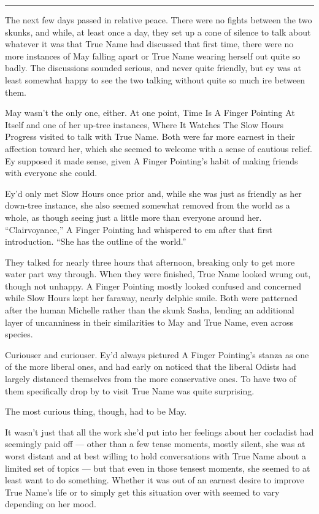 \begin{center}\rule{0.5\linewidth}{0.5pt}\end{center}

The next few days passed in relative peace. There were no fights between the two skunks, and while, at least once a day, they set up a cone of silence to talk about whatever it was that True Name had discussed that first time, there were no more instances of May falling apart or True Name wearing herself out quite so badly. The discussions sounded serious, and never quite friendly, but ey was at least somewhat happy to see the two talking without quite so much ire between them.

May wasn't the only one, either. At one point, Time Is A Finger Pointing At Itself and one of her up-tree instances, Where It Watches The Slow Hours Progress visited to talk with True Name. Both were far more earnest in their affection toward her, which she seemed to welcome with a sense of cautious relief. Ey supposed it made sense, given A Finger Pointing's habit of making friends with everyone she could.

Ey'd only met Slow Hours once prior and, while she was just as friendly as her down-tree instance, she also seemed somewhat removed from the world as a whole, as though seeing just a little more than everyone around her. ``Clairvoyance,'' A Finger Pointing had whispered to em after that first introduction. ``She has the outline of the world.''

They talked for nearly three hours that afternoon, breaking only to get more water part way through. When they were finished, True Name looked wrung out, though not unhappy. A Finger Pointing mostly looked confused and concerned while Slow Hours kept her faraway, nearly delphic smile. Both were patterned after the human Michelle rather than the skunk Sasha, lending an additional layer of uncanniness in their similarities to May and True Name, even across species.

Curiouser and curiouser. Ey'd always pictured A Finger Pointing's stanza as one of the more liberal ones, and had early on noticed that the liberal Odists had largely distanced themselves from the more conservative ones. To have two of them specifically drop by to visit True Name was quite surprising.

The most curious thing, though, had to be May.

It wasn't just that all the work she'd put into her feelings about her cocladist had seemingly paid off — other than a few tense moments, mostly silent, she was at worst distant and at best willing to hold conversations with True Name about a limited set of topics — but that even in those tensest moments, she seemed to at least want to do something. Whether it was out of an earnest desire to improve True Name's life or to simply get this situation over with seemed to vary depending on her mood.

